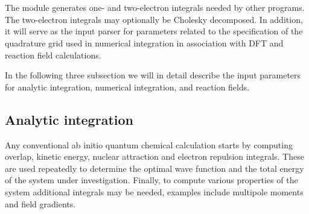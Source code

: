 
\section{}
\label{UG:sec:seward}
The  module generates one- and two-electron integrals needed
by other programs. The two-electron integrals may optionally be
Cholesky decomposed. In addition, it will serve as the input parser
for parameters related to the specification of the quadrature grid
used in numerical integration in association with DFT and reaction
field calculations.


In the following three subsection we will in detail describe the input parameters
for analytic integration, numerical integration, and reaction fields.

\subsection{Analytic integration}
Any conventional ab initio quantum chemical calculation starts by
computing overlap, kinetic energy, nuclear attraction and electron
repulsion integrals. These are used repeatedly to determine the
optimal wave function and the total energy of the system under
investigation. Finally, to compute various properties of the system
additional integrals may be needed, examples include multipole moments
and field gradients.

